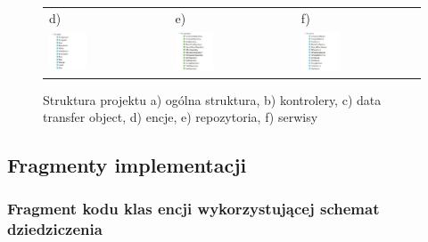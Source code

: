 \begin{figure}[htb]
\begin{tabular}{@{}lll@{}}
	d) & e) & f) \\
	\includegraphics[width=0.33\textwidth]{rys05/backend/entity.pdf} &
	\includegraphics[width=0.33\textwidth]{rys05/backend/repository.pdf} &
	\includegraphics[width=0.33\textwidth]{rys05/backend/service.pdf}
	\end{tabular}
  \caption{Struktura projektu a) ogólna struktura, b) kontrolery, c) data transfer object, d) encje, e) repozytoria, f) serwisy}
  \label{backend_struktura:label}
\end{figure}

\newpage
\subsection{Fragmenty implementacji}
\subsubsection {Fragment kodu klas encji wykorzystującej schemat dziedziczenia}


